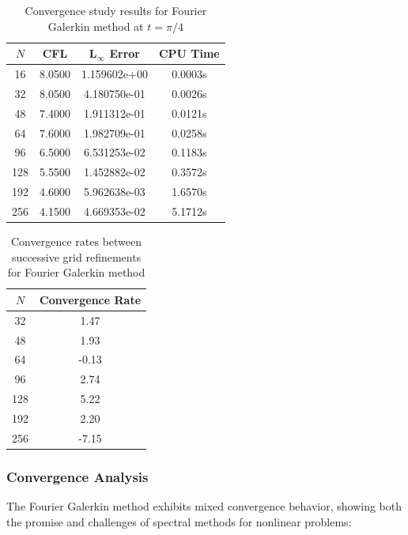 \begin{table}[h]
	\centering
	\begin{tabular}{|c|c|c|c|}
		\hline
		$N$ & CFL    & L$_\infty$ Error & CPU Time \\
		\hline
		16  & 8.0500 & 1.159602e+00     & 0.0003s  \\
		32  & 8.0500 & 4.180750e-01     & 0.0026s  \\
		48  & 7.4000 & 1.911312e-01     & 0.0121s  \\
		64  & 7.6000 & 1.982709e-01     & 0.0258s  \\
		96  & 6.5000 & 6.531253e-02     & 0.1183s  \\
		128 & 5.5500 & 1.452882e-02     & 0.3572s  \\
		192 & 4.6000 & 5.962638e-03     & 1.6570s  \\
		256 & 4.1500 & 4.669353e-02     & 5.1712s  \\
		\hline
	\end{tabular}
	\caption{Convergence study results for Fourier Galerkin method at $t = \pi/4$}
	\label{tab:convergence_galerkin}
\end{table}

\begin{table}[h]
	\centering
	\begin{tabular}{|c|c|}
		\hline
		$N$ & Convergence Rate \\
		\hline
		32  & 1.47             \\
		48  & 1.93             \\
		64  & -0.13            \\
		96  & 2.74             \\
		128 & 5.22             \\
		192 & 2.20             \\
		256 & -7.15            \\
		\hline
	\end{tabular}
	\caption{Convergence rates between successive grid refinements for Fourier Galerkin method}
	\label{tab:rates_galerkin}
\end{table}

\subsubsection{Convergence Analysis}
The Fourier Galerkin method exhibits mixed convergence behavior, showing both the promise and challenges of spectral methods for nonlinear problems:

